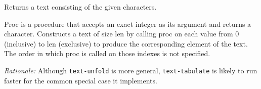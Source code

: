 \begin{entry}{%
  }

  Returns a
  text consisting of the given characters.
\end{entry}

\begin{entry}{%
  }

  Proc is
  a procedure that accepts an exact integer as its argument and
  returns a character. Constructs a text of size len by calling proc
  on each value from 0 (inclusive) to len (exclusive) to produce the
  corresponding element of the text. The order in which proc is called
  on those indexes is not specified.

  \emph{Rationale:} Although \texttt{text-unfold} is more general,
  \texttt{text-tabulate} is likely to run faster for the common
  special case it implements.
\end{entry}

